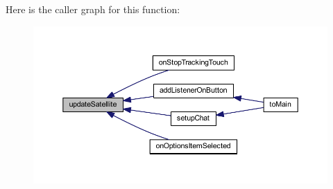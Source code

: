 Here is the caller graph for this function\-:
\nopagebreak
\begin{figure}[H]
\begin{center}
\leavevmode
\includegraphics[width=350pt]{classcom_1_1example_1_1android_1_1_bluetooth_chat_1_1_l_a_s_a_r_control_ab084bbab05e4d41e495608164e6bd56c_icgraph}
\end{center}
\end{figure}




